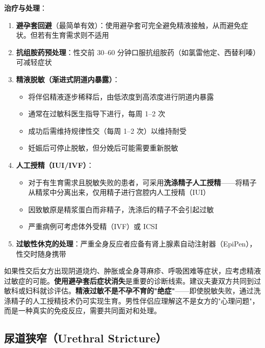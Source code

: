\documentclass[12pt,a4paper,twoside]{ctexbook}
\begin{document}
\vspace{0.5em}
\noindent\textbf{治疗与处理}：

\begin{enumerate}
	\item \textbf{避孕套回避}（最简单有效）：使用避孕套可完全避免精液接触，从而避免症状。但若有生育需求则不适用

	\item \textbf{抗组胺药预处理}：性交前 30--60 分钟口服抗组胺药（如氯雷他定、西替利嗪）可减轻症状

	\item \textbf{精液脱敏（渐进式阴道内暴露）}：
	\begin{itemize}
		\item 将伴侣精液逐步稀释后，由低浓度到高浓度进行阴道内暴露
		\item 通常在过敏科医生指导下进行，每周 1--2 次
		\item 成功后需维持规律性交（每周 1--2 次）以维持耐受
		\item 妊娠后可停止脱敏，但分娩后可能需要重新脱敏
	\end{itemize}

	\item \textbf{人工授精（IUI/IVF）}：
	\begin{itemize}
		\item 对于有生育需求且脱敏失败的患者，可采用\textbf{洗涤精子人工授精}——将精子从精浆中分离出来，仅用精子进行宫腔内人工授精（IUI）
		\item 因致敏原是精浆蛋白而非精子，洗涤后的精子不会引起过敏
		\item 严重病例可考虑体外受精（IVF）或 ICSI
	\end{itemize}

	\item \textbf{过敏性休克的处理}：严重全身反应者应备有肾上腺素自动注射器（EpiPen），性交时随身携带
\end{enumerate}

\begin{tcolorbox}[colback=pink!5!white,colframe=red!50!black,title=贴心小叮咛]
如果性交后女方出现阴道烧灼、肿胀或全身荨麻疹、呼吸困难等症状，应考虑精液过敏症的可能。\textbf{使用避孕套后症状消失}是重要的诊断线索。建议夫妻双方共同到过敏科或妇科就诊评估。\textbf{精液过敏不是不孕不育的"绝症"}——即使脱敏失败，通过洗涤精子的人工授精技术仍可实现生育。男性伴侣应理解这不是女方的"心理问题"，而是一种真实的免疫反应，需要共同面对和处理。
\end{tcolorbox}

\subsection{尿道狭窄（Urethral Stricture）}
\label{subsec:urethral_stricture}
\end{document}
